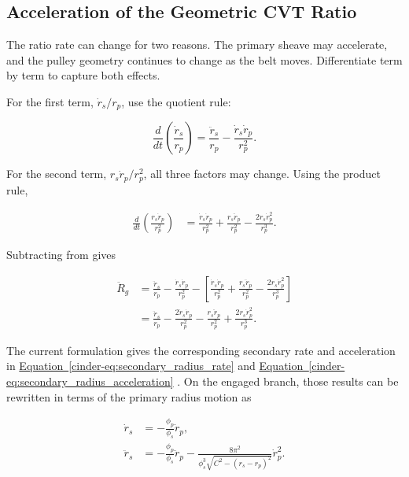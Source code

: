 \documentclass[11pt]{report}
\newcommand{\FormEq}[1]{%
    \hyperref[cinder-#1]{Equation~\ref*{cinder-#1}}%
  }
\newcommand{\FormEq}[1]{\textit{main formulation equation \nolinkurl{#1}}}
\begin{document}
\subsection{Acceleration of the Geometric CVT Ratio}

The ratio rate can change for two reasons. The primary sheave may accelerate,
and the pulley geometry continues to change as the belt moves. Differentiate
 term by term to capture both effects.

For the first term, \(\dot r_s/r_p\), use the quotient rule:

\begin{equation}
\frac{d}{dt}
\left(
\frac{\dot r_s}{r_p}
\right)
=
\frac{\ddot r_s}{r_p}
-
\frac{\dot r_s\dot r_p}{r_p^2}.
\label{eq:ratio_acceleration_first_term}
\end{equation}

For the second term, \(r_s\dot r_p/r_p^2\), all three factors may change.
Using the product rule,

\begin{align}
\frac{d}{dt}
\left(
\frac{r_s\dot r_p}{r_p^2}
\right)
&=
\frac{\dot r_s\dot r_p}{r_p^2}
+
\frac{r_s\ddot r_p}{r_p^2}
-
\frac{2r_s\dot r_p^2}{r_p^3}.
\label{eq:ratio_acceleration_second_term}
\end{align}

Subtracting  from
 gives

\begin{align}
\ddot R_g
&=
\frac{\ddot r_s}{r_p}
-
\frac{\dot r_s\dot r_p}{r_p^2}
-
\left[
\frac{\dot r_s\dot r_p}{r_p^2}
+
\frac{r_s\ddot r_p}{r_p^2}
-
\frac{2r_s\dot r_p^2}{r_p^3}
\right]
\nonumber\\
&=
\frac{\ddot r_s}{r_p}
-
\frac{2\dot r_s\dot r_p}{r_p^2}
-
\frac{r_s\ddot r_p}{r_p^2}
+
\frac{2r_s\dot r_p^2}{r_p^3}.
\label{eq:geometric_ratio_acceleration_general}
\end{align}

The current formulation gives the corresponding secondary rate and acceleration in
\FormEq{eq:secondary_radius_rate} and \FormEq{eq:secondary_radius_acceleration}. On the engaged branch, those results can be rewritten in terms of the primary radius motion as

\begin{align}
\dot r_s
&=
-\frac{\phi_p}{\phi_s}\dot r_p,
\label{eq:geometric_ratio_secondary_rate_recalled}\\[6pt]
\ddot r_s
&=
-\frac{\phi_p}{\phi_s}\ddot r_p
-
\frac{8\pi^2}
{\phi_s^3\sqrt{C^2-(r_s-r_p)^2}}
\dot r_p^2.
\label{eq:geometric_ratio_secondary_acceleration_recalled}
\end{align}
\end{document}
